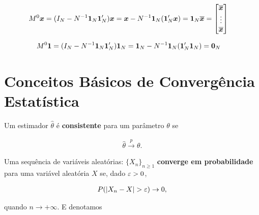 \documentclass[11pt, oneside, a4paper, article]{article}
\numberwithin{equation}{section}
\begin{document}
\begin{description}
\begin{description}
\vspace{-1 em}
\begin{align*}
M^{0} \boldsymbol{x} &= 
( I_{N} - N^{-1} \boldsymbol{1}_{N} \boldsymbol{1}_{N}' ) \boldsymbol{x} 
= 
\boldsymbol{x} - N^{-1} \boldsymbol{1}_{N} (\boldsymbol{1}_{N}' \boldsymbol{x}) 
=
\boldsymbol{1}_{N} \overline{\boldsymbol{x}}
=
\begin{bmatrix}
\overline{\boldsymbol{x}} \\ \vdots \\ \overline{\boldsymbol{x}}
\end{bmatrix}
\end{align*}

\vspace{-1 em}
\begin{align*}
M^{0} \boldsymbol{1} &= 
( I_{N} - N^{-1} \boldsymbol{1}_{N} \boldsymbol{1}_{N}' ) \boldsymbol{1}_{N}
= 
\boldsymbol{1}_{N} - N^{-1} \boldsymbol{1}_{N} (\boldsymbol{1}_{N}' \boldsymbol{1}_{N}) 
=
\boldsymbol{0}_{N} 
\end{align*}

\clearpage
\section{Conceitos Básicos de Convergência Estatística} \label{app1}

\begin{def1}
Um estimador $\hat{\theta}$ é \textbf{consistente} para um parâmetro $\theta$ se 

\vspace{-1 em}
\begin{align*}
\hat{\theta} \overset{p}{\longrightarrow} \theta.
\end{align*}
\end{def1}

\begin{def1}
Uma sequência de variáveis aleatórias:
$\{ X_{n} \}_{n \geq 1}$ 
\textbf{converge em probabilidade} para uma variável aleatória $X$ se, dado $\varepsilon > 0$, 

\vspace{-1 em}
\begin{align*}
	P(| X_{n} - X | > \varepsilon ) \to 0,
\end{align*}

\noindent
quando $n \to + \infty$.
E denotamos


\end{def1}
\end{description}
\end{description}
\end{document}
